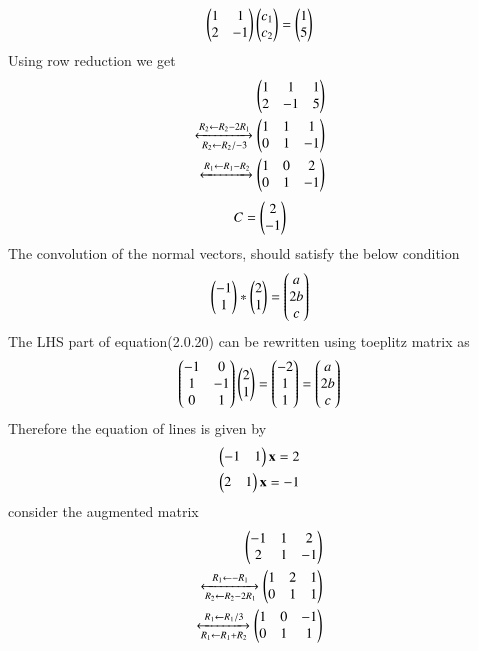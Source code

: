  \begin{align}
 \begin{pmatrix}1&1\\2&-1\end{pmatrix}\begin{pmatrix}c_1\\c_2\end{pmatrix}=\begin{pmatrix}1\\5\end{pmatrix}
 \end{align}
 Using row reduction we get
 \begin{align}
\begin{pmatrix}1&1&1\\2&-1&5\end{pmatrix}\\
\xleftrightarrow[R_2\leftarrow R_2/-3]{R_2\leftarrow R_2-2R_1}
\begin{pmatrix}1&1&1\\0&1&-1\end{pmatrix}\\\xleftrightarrow[]{R_1\leftarrow R_1-R_2}
\begin{pmatrix}1&0&2\\0&1&-1\end{pmatrix}
\end{align}
\begin{align}
C  =\begin{pmatrix}2\\-1\end{pmatrix}
\end{align}
 The convolution of the normal vectors, should satisfy the below condition
 \begin{align}
    \begin{pmatrix}-1\\1\end{pmatrix}*\begin{pmatrix}2\\1\end{pmatrix}=\begin{pmatrix}a\\2b\\c\end{pmatrix}
\end{align}
The LHS part of equation(2.0.20) can be rewritten using toeplitz matrix as
\begin{align}
    \begin{pmatrix}-1&0\\1&-1\\0&1\end{pmatrix}\begin{pmatrix}2\\1\end{pmatrix}=\begin{pmatrix}-2\\1\\1\end{pmatrix}=\begin{pmatrix}a\\2b\\c\end{pmatrix}
\end{align}
Therefore the equation of lines is given by 
\begin{align}
\begin{pmatrix}-1&1\end{pmatrix}\mathbf{x}=2\\
\begin{pmatrix}2&1\end{pmatrix}\mathbf{x}=-1
\end{align}
consider the augmented matrix
\begin{align}
\begin{pmatrix}-1&1&2\\2&1&-1\end{pmatrix}\\
\xleftrightarrow[R_2\leftarrow R_2-2R_1]{R_1\leftarrow -R_1}
\begin{pmatrix}1&2&1\\0&1&1\end{pmatrix}\\\xleftrightarrow[R_1\leftarrow R_1+R_2]{R_1\leftarrow R_1/3}
\begin{pmatrix}1&0&-1\\0&1&1\end{pmatrix}
\end{align}
